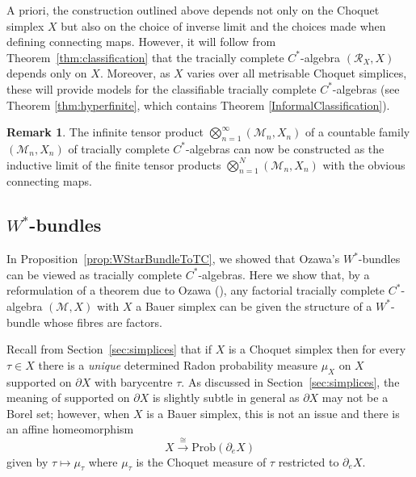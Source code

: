 \documentclass[a4paper,11pt]{amsart}
\theoremstyle{definition}
\newtheorem{remark}[theorem]{Remark}
\numberwithin{equation}{section}
\numberwithin{theorem}{section}
\newcommand{\R}{\mathcal R}
\newcommand{\M}{\mathcal{M}}
\begin{document}
A priori, the construction outlined above depends not only on the Choquet simplex $X$ but also on the choice of inverse limit and the choices made when defining connecting maps. However, it will follow from Theorem~\ref{thm:classification} that the tracially complete $C^*$-algebra $(\R_X,X)$ depends only on $X$.  Moreover, as $X$ varies over all metrisable Choquet simplices, these will provide models for the classifiable tracially complete $C^*$-algebras (see Theorem \ref{thm:hyperfinite}, which contains Theorem \ref{InformalClassification}).

\begin{remark}
    The infinite tensor product $\bigotimes_{n=1}^\infty (\M_n,X_n)$ of a countable family $(\M_n,X_n)$ of tracially complete $C^*$-algebras can now be constructed as the inductive limit of the finite tensor products $\bigotimes_{n=1}^N(\M_n,X_n)$ with the obvious connecting maps.
\end{remark}

\subsection{\texorpdfstring{$W^*$}{W*}-bundles}\label{sec:WStarBundles}

In Proposition~\ref{prop:WStarBundleToTC}, we showed that Ozawa's $W^*$-bundles can be viewed as tracially complete $C^*$-algebras.  Here we show that, by a reformulation of a theorem due to Ozawa (\cite{Oz13}), any factorial tracially complete $C^*$-algebra $(\mathcal M, X)$ with $X$ a Bauer simplex can be given the structure of a $W^*$-bundle whose fibres are factors.  

Recall from Section~\ref{sec:simplices} that if $X$ is a Choquet simplex then for every $\tau \in X$ there is a \emph{unique} determined Radon probability measure $\mu_X$ on $X$ supported on $\partial X$ with barycentre $\tau$. As discussed in Section~\ref{sec:simplices}, the meaning of supported on $\partial X$ is slightly subtle in general as $\partial X$ may not be a Borel set; however, when $X$ is a Bauer simplex, this is not an issue and there is an affine homeomorphism
\begin{equation}
\label{eq:mu_tau-def}
	X \overset\cong\longrightarrow \mathrm{Prob}(\partial_e X) 
\end{equation}
given by $\tau \mapsto \mu_\tau$ where $\mu_\tau$ is the Choquet measure of $\tau$ restricted to $\partial_e X$.
\end{document}
